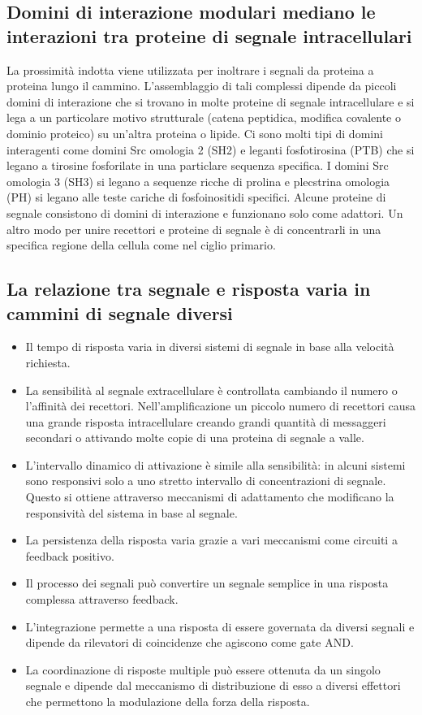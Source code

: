 \subsection{Domini di interazione modulari mediano le interazioni tra proteine di segnale intracellulari}
La prossimit\`a indotta viene utilizzata per inoltrare i segnali da proteina a proteina lungo il cammino. L'assemblaggio di tali complessi dipende da piccoli domini di interazione che
si trovano in molte proteine di segnale intracellulare e si lega a un particolare motivo strutturale (catena peptidica, modifica covalente o dominio proteico) su un'altra proteina o 
lipide. Ci sono molti tipi di domini interagenti come domini Src omologia 2 (SH2) e leganti fosfotirosina (PTB) che si legano a tirosine fosforilate in una particlare sequenza specifica.
I domini Src omologia 3 (SH3) si legano a sequenze ricche di prolina e plecstrina omologia (PH) si legano alle teste cariche di fosfoinositidi specifici. Alcune proteine di segnale 
consistono di domini di interazione e funzionano solo come adattori. Un altro modo per unire recettori e proteine di segnale \`e di concentrarli in una specifica regione della cellula
come nel ciglio primario. 
\subsection{La relazione tra segnale e risposta varia in cammini di segnale diversi}
\begin{itemize}
	\item Il tempo di risposta varia in diversi sistemi di segnale in base alla velocit\`a richiesta.
	\item La sensibilit\`a al segnale extracellulare \`e controllata cambiando il numero o l'affinit\`a dei recettori. Nell'amplificazione un piccolo numero di recettori causa
		una grande risposta intracellulare creando grandi quantit\`a di messaggeri secondari o attivando molte copie di una proteina di segnale a valle.
	\item L'intervallo dinamico di attivazione \`e simile alla sensibilit\`a: in alcuni sistemi sono responsivi solo a uno stretto intervallo di concentrazioni di segnale. Questo
		si ottiene attraverso meccanismi di adattamento che modificano la responsivit\`a del sistema in base al segnale.
	\item La persistenza della risposta varia grazie a vari meccanismi come circuiti a feedback positivo.
	\item Il processo dei segnali pu\`o convertire un segnale semplice in una risposta complessa attraverso feedback.
	\item L'integrazione permette a una risposta di essere governata da diversi segnali e dipende da rilevatori di coincidenze che agiscono come gate AND.
	\item La coordinazione di risposte multiple pu\`o essere ottenuta da un singolo segnale e dipende dal meccanismo di distribuzione di esso a diversi effettori che permettono la
		modulazione della forza della risposta.
\end{itemize}
